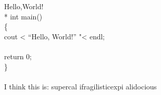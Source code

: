 \documentclass[11pt,a4paper]{article}
\begin{document}
Hello,World!\\*
int main()\\
\{\\
    cout < ``Hello, World!'' "< endl; \\
    \\
    return 0; \\
\}\\
\\
I think this is: su\-per\-cal\-%
i\-frag\-i\-lis\-tic\-ex\-pi\-%
al\-i\-do\-cious
\end{document}
